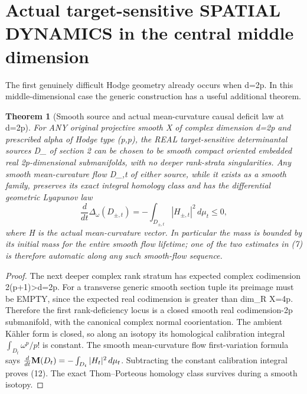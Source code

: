 \documentclass[11pt]{article}
\newtheorem{theorem}{Theorem}
\begin{document}
\section{Actual target-sensitive SPATIAL DYNAMICS in the central middle dimension}
The first genuinely difficult Hodge
geometry already occurs when d=2p.
In this middle-dimensional
case the generic construction
has a useful additional theorem.

\begin{theorem}[Smooth source and actual mean-curvature causal deficit law at d=2p]
For ANY original projective
smooth X of complex dimension
d=2p and prescribed alpha
of Hodge type (p,p),
the REAL target-sensitive
determinantal sources D_\pm
of section 2 can be chosen
to be smooth compact oriented
embedded real 2p-dimensional
submanifolds, with no deeper
rank-strata singularities.
Any smooth mean-curvature
flow D_{\pm,t} of either
source, while it exists
as a smooth family,
preserves its exact
integral homology class
and has the differential
geometric Lyapunov law
\[
 \boxed{
 \frac{d}{dt}
 \Delta_\omega(D_{\pm,t})
  =-\int_{D_{\pm,t}}
               |H_{\pm,t}|^2\,d\mu_t
  \le0,
 }                                                       \tag{12}
\]
where H is the actual
mean-curvature vector.
In particular the mass
is bounded by its initial
mass for the entire
smooth flow lifetime;
one of the two estimates
in (7) is therefore
automatic along any
such smooth-flow sequence.
\end{theorem}
\begin{proof}
The next deeper complex
rank stratum has expected
complex codimension
2(p+1)>d=2p.
For a transverse generic
smooth section tuple
its preimage must be EMPTY,
since the expected real
codimension is greater
than dim_R X=4p.
Therefore the first
rank-deficiency locus
is a closed smooth
real codimension-2p
submanifold, with
the canonical complex
normal coorientation.
The ambient Kähler form
is closed, so along
an isotopy its homological
calibration integral
$\int_{D_t}\omega^p/p!$
is constant.
The smooth mean-curvature
flow first-variation
formula says
$\frac{d}{dt}{\bf M}(D_t)
  =-\int_{D_t}|H_t|^2\,d\mu_t$.
Subtracting the
constant calibration
integral proves (12).
The exact Thom--Porteous
homology class survives
during a smooth isotopy.
\end{proof}
\end{document}
